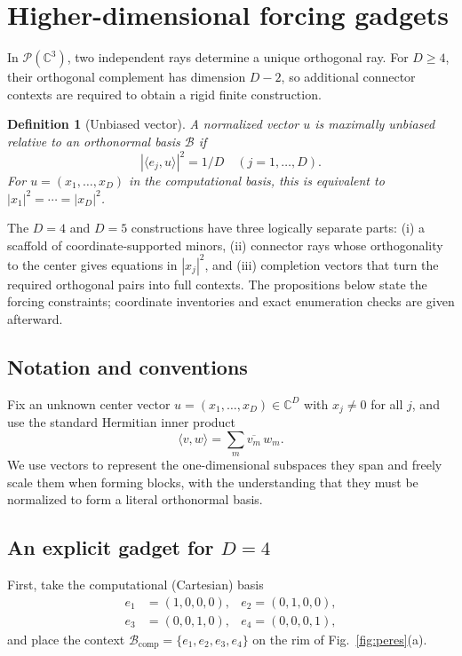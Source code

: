 \documentclass[%
  reprint,
  superscriptaddress,
  showpacs,
  showkeys,
  amsmath,amssymb,
  pra,
  longbibliography,
  floatfix,
  x11names
]{revtex4-2}
\newcommand{\rev}[1]{{\color{revisionblue}#1}}
\newenvironment{revision}{\begingroup\color{revisionblue}}{\endgroup}
\newtheorem{definition}{Definition}
\begin{document}
\section{Higher-dimensional forcing gadgets}
\label{2025-hdfg}

\begin{revision}
In $\mathcal{P}(\mathbb{C}^3)$, two independent rays determine a unique orthogonal ray.  For $D\geq4$, their orthogonal complement has dimension $D-2$, so additional connector contexts are required to obtain a rigid finite construction.

\begin{definition}[Unbiased vector]
\label{def:unbiased}
A normalized vector $u$ is maximally unbiased relative to an orthonormal basis $\mathcal{B}$ if
\[
|\langle e_j,u\rangle|^2=1/D\quad (j=1,\ldots,D).
\]
For $u=(x_1,\ldots,x_D)$ in the computational basis, this is equivalent to $|x_1|^2=\cdots=|x_D|^2$.
\end{definition}

The $D=4$ and $D=5$ constructions have three logically separate parts: (i) a scaffold of coordinate-supported minors, (ii) connector rays whose orthogonality to the center gives equations in $|x_j|^2$, and (iii) completion vectors that turn the required orthogonal pairs into full contexts.  The propositions below state the forcing constraints; coordinate inventories and exact enumeration checks are given afterward.
\end{revision}

\subsection{Notation and conventions}
Fix an unknown center vector $u = (x_1,\dots,x_D) \in \mathbb{C}^D$ with $x_j \ne 0$ for all $j$, and use the standard Hermitian inner product
\[
\langle v,w\rangle = \sum_m \overline{v_m}\, w_m.
\]
We use vectors to represent the one-dimensional subspaces they span and freely scale them when forming blocks,
with the understanding that they must be normalized to form a literal orthonormal basis.

\subsection{An explicit gadget for $D=4$}

\rev{First, take the computational (Cartesian) basis}
\begin{align*}
e_1&=(1,0,0,0), &
e_2 =(0,1,0,0),\\
e_3&=(0,0,1,0), &
e_4 =(0,0,0,1),
\end{align*}
\rev{and place the context $\mathcal{B}_{\mathrm{comp}}=\{e_1,e_2,e_3,e_4\}$ on the rim of Fig.~\ref{fig:peres}(a).}
\end{document}
